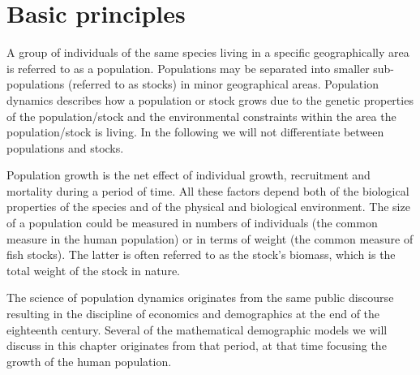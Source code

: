 \documentclass[11pt,fleqn]{book} %
\begin{document}
\section{Basic principles}
A group of individuals of the same species living in a specific geographically area is referred to as a population. Populations may be separated into smaller sub-populations (referred to as stocks) in minor geographical areas. Population dynamics describes how a population or stock grows due to the genetic properties of the population/stock and the environmental constraints within the area the population/stock is living. In the following we will not differentiate between populations and stocks.

Population growth is the net effect of individual growth, recruitment and mortality during a period of time. All these factors depend both of the biological properties of the species and of the physical and biological environment. The size of a population could be measured in numbers of individuals (the common measure in the human population) or in terms of weight (the common measure of fish stocks). The latter is often referred to as the stock's biomass, which is the total weight of the stock in nature.

The science of population dynamics originates from the same public discourse resulting in the discipline of economics and demographics at the end of the eighteenth century. Several of the mathematical demographic models we will discuss in this chapter originates from that period, at that time focusing the growth of the human population.

\begin{figure}[!htb]
\end{figure}

\end{document}
